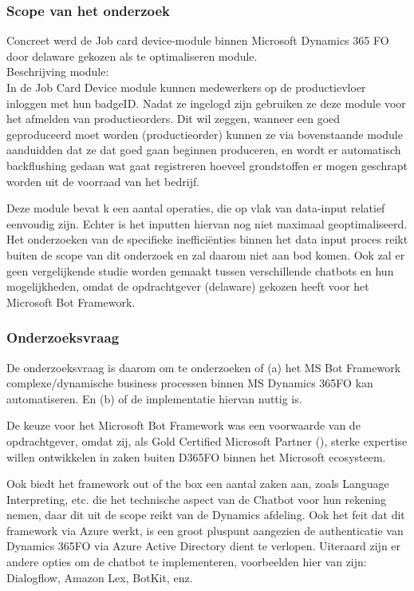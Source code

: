 \subsubsection{Scope van het onderzoek}
Concreet werd de Job card device-module binnen Microsoft Dynamics 365 FO door delaware gekozen als te optimaliseren module.\\
Beschrijving module:\\
In de Job Card Device module kunnen medewerkers op de productievloer inloggen met hun badgeID. Nadat ze ingelogd zijn gebruiken ze deze module voor het afmelden van productieorders. Dit wil zeggen, wanneer een goed geproduceerd moet worden (productieorder) kunnen ze via bovenstaande module aanduidden dat ze dat goed gaan beginnen produceren, en wordt er automatisch backflushing gedaan wat gaat registreren hoeveel grondstoffen er mogen geschrapt worden uit de voorraad van het bedrijf. 

Deze module bevat k een aantal operaties, die op vlak van data-input relatief eenvoudig zijn. Echter is het inputten hiervan nog niet maximaal geoptimaliseerd. Het onderzoeken van de specifieke inefficiënties binnen het data input proces reikt buiten de scope van dit onderzoek en zal daarom niet aan bod komen. Ook zal er geen vergelijkende studie worden gemaakt tussen verschillende chatbots en hun mogelijkheden, omdat de opdrachtgever (delaware) gekozen heeft voor het Microsoft Bot Framework. 

\subsubsection{Onderzoeksvraag}
De onderzoeksvraag is daarom om te onderzoeken of (a) het MS Bot Framework complexe/dynamische business processen binnen MS Dynamics 365FO kan
automatiseren. En (b) of de implementatie hiervan nuttig is. 

De keuze voor het Microsoft Bot Framework was een voorwaarde van de opdrachtgever, omdat zij, als Gold Certified Microsoft Partner (\textcite{Delaware2009}), sterke expertise willen ontwikkelen in zaken buiten D365FO binnen het Microsoft ecosysteem. 


Ook biedt het framework out of the box een aantal zaken aan, zoals Language Interpreting, etc. die het technische aspect van de Chatbot voor hun rekening nemen, daar dit uit de scope reikt van de Dynamics afdeling. Ook het feit dat dit framework via Azure werkt, is een groot pluspunt aangezien de authenticatie van Dynamics 365FO via Azure Active Directory dient te verlopen. Uiteraard zijn er andere opties om de chatbot te implementeren, voorbeelden hier van zijn: Dialogflow, Amazon Lex, BotKit, enz.  


